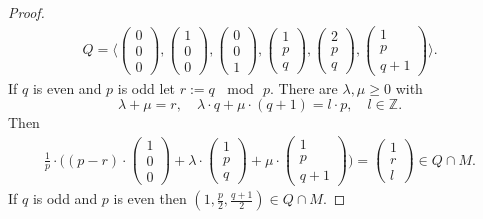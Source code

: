\documentclass[12pt, english]{article}
\begin{document}
\begin{proof}
\begin{align*}
		Q = \langle \begin{pmatrix} 0\\0\\0 \end{pmatrix}, \begin{pmatrix} 1\\0\\0 \end{pmatrix}, \begin{pmatrix} 0\\0\\1 \end{pmatrix}, \begin{pmatrix} 1\\p\\q \end{pmatrix}, \begin{pmatrix} 2\\p\\q \end{pmatrix}, \begin{pmatrix} 1\\p\\q+1 \end{pmatrix} \rangle.
	\end{align*}
	If $q$ is even and $p$ is odd let $r:= q \, \mod \, p$. There are $\lambda,\mu \geq 0$ with
	\[ \lambda + \mu = r, \quad \lambda \cdot q + \mu \cdot (q+1) = l \cdot p, \quad l \in \mathbb{Z}.  \]
	Then
	\begin{align*}
		\frac{1}{p} \cdot \big( (p-r) \cdot \begin{pmatrix} 1\\0\\0	\end{pmatrix} + \lambda \cdot \begin{pmatrix} 1\\p\\q \end{pmatrix} + \mu \cdot \begin{pmatrix}  1\\p\\q+1 \end{pmatrix} \big) = \begin{pmatrix} 1\\r\\l	\end{pmatrix} \in Q \cap M.
	\end{align*}
	If $q$ is odd and $p$ is even then $(1,\frac{p}{2}, \frac{q+1}{2}) \in Q \cap M$.
\end{proof}
\end{document}
